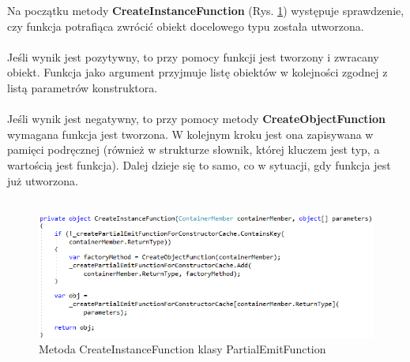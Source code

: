 \documentclass[12pt]{article}
\begin{document}
Na początku metody \textbf{CreateInstanceFunction} (Rys. \ref{fig:PartialEmitFunction_CreateInstanceFunction}) występuje sprawdzenie, czy funkcja potrafiąca zwrócić obiekt docelowego typu została utworzona.\\
\\
Jeśli wynik jest pozytywny, to przy pomocy funkcji jest tworzony i zwracany obiekt. Funkcja jako argument przyjmuje listę obiektów w kolejności zgodnej z listą parametrów konstruktora.\\
\\
Jeśli wynik jest negatywny, to przy pomocy metody \textbf{CreateObjectFunction} wymagana funkcja jest tworzona. W kolejnym kroku jest ona zapisywana w pamięci podręcznej (również w strukturze słownik, której kluczem jest typ, a wartością jest funkcja). Dalej dzieje się to samo, co w sytuacji, gdy funkcja jest już utworzona.\\ \\
\begin{figure}[H]
	\begin{center}
  		\includegraphics{PartialEmitFunction_CreateInstanceFunction.png}
  		\caption{Metoda CreateInstanceFunction klasy PartialEmitFunction}
  		\label{fig:PartialEmitFunction_CreateInstanceFunction}
	\end{center}
\end{figure}
\end{document}
